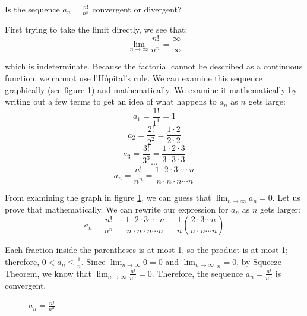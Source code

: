 \begin{Worked}
\begin{Problem}
Is the sequence $a_n = \frac{n!}{n^n}$ convergent or divergent?
\end{Problem}
\begin{Solution}
First trying to take the limit directly, we see that:
$$\lim_{n \to \infty} \frac{n!}{n^n} = \frac{\infty}{\infty}$$

which is indeterminate. Because the factorial cannot be described as a continuous
function, we cannot use l'H\^{o}pital's rule. We can examine this sequence
graphically (see figure \ref{fig:factorial}) and mathematically. We examine it
mathematically by writing out a few terms to get an idea of what happens to
$a_n$ as $n$ gets large:
$$a_1 = \frac{1!}{1^1} = 1$$
$$a_2 = \frac{2!}{2^2} = \frac{1 \cdot 2}{2 \cdot 2}$$
$$a_3 = \frac{3!}{3^3} = \frac{1 \cdot 2 \cdot 3}{3 \cdot 3 \cdot 3}$$
$$\cdots$$
$$a_n = \frac{n!}{n^n} = \frac{1 \cdot 2 \cdot 3 \cdots \cdot n}{n
        \cdot n \cdot n \cdots n}$$

From examining the graph in figure \ref{fig:factorial}, we can guess that
$\lim_{n \to \infty} a_n = 0$. Let us prove that mathematically. We can rewrite
our expression for $a_n$ as $n$ gets larger:
$$a_n = \frac{n!}{n^n} = \frac{1 \cdot 2 \cdot 3 \cdots \cdot n}{n
        \cdot n \cdot n \cdots n} = \frac{1}{n}(\frac{2 \cdot 3 \cdots n}{n
        \cdot n \cdots n})$$

Each fraction inside the parentheses is at most 1, so the product is at most 1; therefore, $0 < a_n \leq
    \frac{1}{n}$. Since $\lim_{n \to \infty} 0 = 0$ and $\lim_{n \to \infty}
    \frac{1}{n} = 0$, by Squeeze Theorem, we know that $\lim_{n \to \infty}
    \frac{n!}{n^n} = 0$. Therefore, the sequence $a_n = \frac{n!}{n^n}$ is
convergent.

\begin{figure}[H]
    \centering
    \caption{$a_n = \frac{n!}{n^n}$}
    \label{fig:factorial}
\end{figure}
\end{Solution}
\end{Worked}

